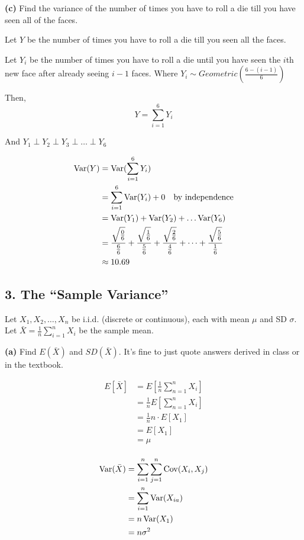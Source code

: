 \documentclass[11pt]{article}
\begin{document}
\textbf{(c)} Find the variance of the number of times you have to roll a
die till you have seen all of the faces.

Let $ Y $ be the number of times you have to roll a die till you seen all the faces. 

Let $ Y_{i} $ be the number of times you have to roll a die until you have seen the $ i $th new face after already seeing $ i-1 $ faces. Where $ Y_{i} \sim Geometric(\frac{6-(i-1)}{6}) $  

Then, 
\[
Y = \sum_{i=1}^{6}Y_{i} 
\]

And $ Y_{1} \perp Y_{2} \perp Y_{3} \perp \dots \perp Y_{6} $ 

\begin{align*}
	\operatorname{Var}(Y) &= \operatorname{Var}(\sum_{i=1}^{6}Y_{i}) \\
	&= \sum_{i=1}^{6}\operatorname{Var}(Y_{i}) + 0 \quad \text{by independence}\\
	&= \operatorname{Var}(Y_1) + \operatorname{Var}(Y_{2}) + \dots \operatorname{Var}(Y_{6})\\
	&= \frac{\sqrt{\frac{0}{6}}}{\frac{6}{6}} + \frac{\sqrt{\frac{1}{6}}}{\frac{5}{6}} + \frac{\sqrt{\frac{2}{6}}}{\frac{4}{6}} + \dots + \frac{\sqrt{\frac{5}{6}}}{\frac{1}{6}} \\
	&\approx 10.69  
\end{align*}


    \newpage

    \subsection*{3. The ``Sample Variance''}\label{the-sample-variance}

Let \(X_1, X_2, \ldots, X_n\) be i.i.d. (discrete or continuous), each
with mean \(\mu\) and SD \(\sigma\). Let
\(\bar{X} = \frac{1}{n}\sum_{i=1}^n X_i\) be the sample mean.

\textbf{(a)} Find \(E(\bar{X})\) and \(SD(\bar{X})\). It's fine to just
quote answers derived in class or in the textbook.


\begin{align*}
	E[\bar{X}] &= E[\frac{1}{n}\sum_{n=1}^{n}X_{i}] \\
	&= \frac{1}{n}E[\sum_{n=1}^{n}X_{i}]\\
	&= \frac{1}{n} n\cdot E[X_{1}] \\
	&= E[X_{1}] \\
	&= \mu  \\
\end{align*}

\begin{align*}
	\operatorname{Var}(\bar X) &= \sum_{i=1}^{n}\sum_{j=1}^{n}\operatorname{Cov}(X_{i},X_{j}) \\
	&= \sum_{i=1}^{n}\operatorname{Var}(X_{ia}) \\
	&= n\operatorname{Var}(X_1) \\
	&= n\sigma^{2} \\
\end{align*}
\end{document}

